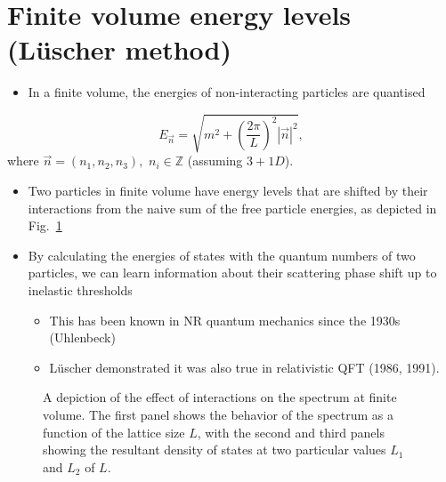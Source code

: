 \section{Finite volume energy levels (Lüscher method)}
\begin{itemize}
    \item In a finite volume, the energies of non-interacting particles are quantised
\end{itemize}
\begin{equation}
    E_{\vec{n}} = \sqrt{m^2 + \left(\frac{2 \pi}{L}\right)^2|\vec{n}|^2},
\end{equation}
where $\vec{n} = (n_1, n_2, n_3),$ $n_i \in \mathbb{Z}$ (assuming $3+1D$).
\begin{itemize}
    \item Two particles in finite volume have energy levels that are shifted by their interactions from the naive sum of the free particle energies, as depicted in Fig.~\ref{fig:int_spec}
    \item By calculating the energies of states with the quantum numbers of two particles, we can learn information about their scattering phase shift up to inelastic thresholds
    \begin{itemize}
        \item This has been known in NR quantum mechanics since the 1930s (Uhlenbeck)
        \item L\"uscher demonstrated it was also true in relativistic QFT (1986, 1991).
    \end{itemize}
\end{itemize}
\begin{figure}
\begin{subfigure}{0.3\textwidth}
\end{subfigure}
\begin{subfigure}{0.3\textwidth}
\end{subfigure}
\begin{subfigure}{0.3\textwidth}
\end{subfigure}
\caption{A depiction of the effect of interactions on the spectrum at finite volume. The first panel shows the behavior of the spectrum as a function of the lattice size $L$, with the second and third panels showing the resultant density of states at two particular values $L_1$ and $L_2$ of $L$.}
\label{fig:int_spec}
\end{figure}
